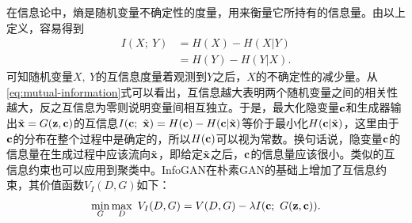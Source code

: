 在信息论中，熵是随机变量不确定性的度量，用来衡量它所持有的信息量。由以上定义，容易得到
\begin{equation}
  \begin{split}
    I(X;~Y) &= H(X) - H(X|Y) \\
    &= H(Y) - H(Y|X).
  \end{split}
\end{equation}
可知随机变量$X,~Y$的互信息度量着观测到$Y$之后，$X$的不确定性的减少量。从\eqref{eq:mutual-information}式可以看出，互信息越大表明两个随机变量之间的相关性越大，反之互信息为零则说明变量间相互独立。于是，最大化隐变量$\mathbf{c}$和生成器输出$\tilde{\mathbf{x}} = G(\mathbf{z}, \mathbf{c})$的互信息$I(\mathbf{c}; ~\tilde{\mathbf{x}}) = H(\mathbf{c}) - H(\mathbf{c}|\tilde{\mathbf{x}})$等价于最小化$H(\mathbf{c}|\tilde{\mathbf{x}})$，这里由于$\mathbf{c}$的分布在整个过程中是确定的，所以$H(\mathbf{c})$可以视为常数。换句话说，隐变量$\mathbf{c}$的信息量在生成过程中应该流向$\tilde{\mathbf{x}}$，即给定$\tilde{\mathbf{x}}$之后，$\mathbf{c}$的信息量应该很小。类似的互信息约束也可以应用到聚类中\citep{bridle1992unsupervised,barber2006kernelized,krause2010discriminative}。InfoGAN在朴素GAN的基础上增加了互信息约束，其价值函数$V_I(D,G)$如下：
\begin{equation}
  \min_G\max_D ~V_I(D,G) = V(D,G) - \lambda I(\mathbf{c};~G(\mathbf{z},\mathbf{c})).
\end{equation}


